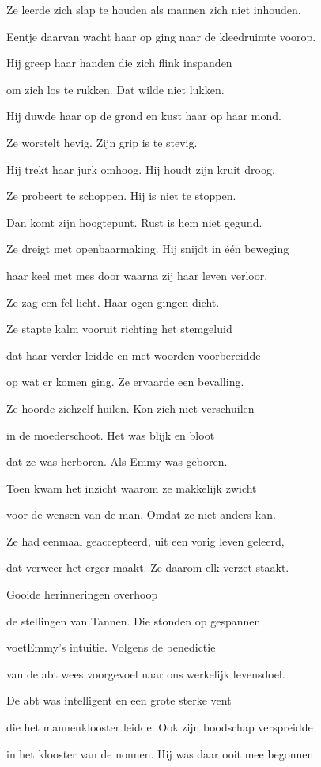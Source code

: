 Ze leerde zich slap te houden
als mannen zich niet inhouden.

Eentje daarvan wacht haar op
ging naar de kleedruimte voorop.

Hij greep haar handen
die zich flink inspanden

om zich los te rukken.
Dat wilde niet lukken.

Hij duwde haar op de grond
en kust haar op haar mond.

Ze worstelt hevig.
Zijn grip is te stevig.

Hij trekt haar jurk omhoog.
Hij houdt zijn kruit droog.

Ze probeert te schoppen.
Hij is niet te stoppen.

Dan komt zijn hoogtepunt.
Rust is hem niet gegund.

Ze dreigt met openbaarmaking.
Hij snijdt in één beweging

haar keel met mes door
waarna zij haar leven verloor.

Ze zag een fel licht.
Haar ogen gingen dicht.

Ze stapte kalm vooruit
richting het stemgeluid

dat haar verder leidde
en met woorden voorbereidde

op wat er komen ging.
Ze ervaarde een bevalling.

Ze hoorde zichzelf huilen.
Kon zich niet verschuilen

in de moederschoot.
Het was blijk en bloot

dat ze was herboren.
Als Emmy was geboren.

Toen kwam het inzicht
waarom ze makkelijk zwicht

voor de wensen van de man.
Omdat ze niet anders kan.

Ze had eenmaal geaccepteerd,
uit een vorig leven geleerd,

dat verweer het erger maakt.
Ze daarom elk verzet staakt.

Gooide herinneringen overhoop

de stellingen van Tannen.
Die stonden op gespannen

voetEmmy’s intuitie.
Volgens de benedictie

van de abt wees voorgevoel
naar ons werkelijk levensdoel.

De abt was intelligent
en een grote sterke vent

die het mannenklooster leidde.
Ook zijn boodschap verspreidde

in het klooster van de nonnen.
Hij was daar ooit mee begonnen

